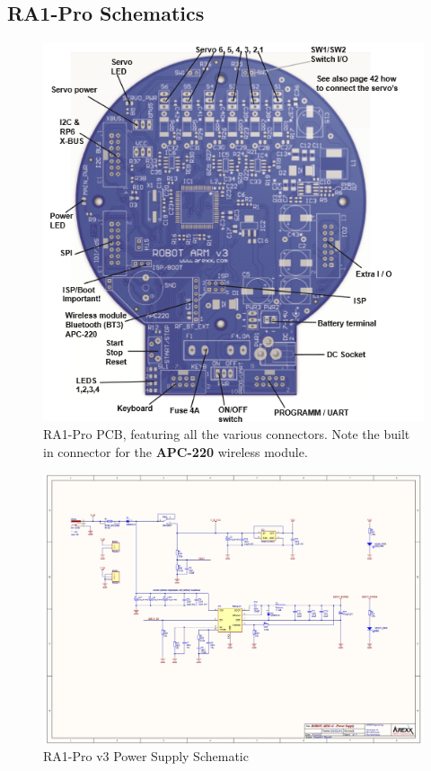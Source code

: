 \documentclass[12p,a4paper]{report}
\begin{document}
\let\cleardoublepage\clearpage
\begin{appendices}

\chapter{RA1-Pro Schematics}

\begin{figure}[H]
\begin{center}
\includegraphics{pcb-arm}
\caption{RA1-Pro PCB, featuring all the various connectors. Note the built in connector for the \textbf{APC-220} wireless module. \cite{arexx}}
\label{fig:pcb-arm}
\end{center}
\end{figure}

\begin{figure}[H]
\includegraphics[scale=0.45]{arm-supply-schematic}
\caption{RA1-Pro v3 Power Supply Schematic \cite{arexx}}
\label{fig:arm-supply-schematic}
\end{figure}


\end{appendices}
\end{document}
